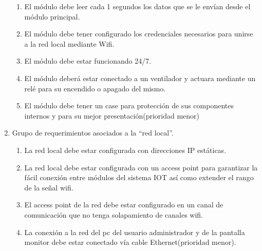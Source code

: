 \documentclass[11pt]{charter}
\begin{document}
\begin{enumerate}
\begin{enumerate}
	\item El módulo debe leer cada 1 segundos los datos que se le envían desde el módulo principal.
	\item El módulo debe tener configurado los credenciales necesarios para unirse a la red local mediante Wifi.
	\item El módulo debe estar funcionando 24/7.
	\item El módulo deberá estar conectado a un ventilador y actuara mediante un relé para su encendido o apagado del mismo.
	\item El módulo debe tener un case para protección de sus componentes internos y para su mejor presentación(prioridad menor)
	\end{enumerate}

\item Grupo de requerimientos asociados a la ``red local''.
	\begin{enumerate}
	\item La red local debe estar configurada con direcciones IP estáticas.
	\item La red local debe estar configurada con un access point para garantizar la fácil conexión entre módulos del sistema IOT así como extender el rango de la señal wifi.
	\item El access point de la red debe estar configurado en un canal de comunicación que no tenga solapamiento de canales wifi.
	\item La conexión a la red del pc del usuario administrador y de la pantalla monitor debe estar conectado vía cable Ethernet(prioridad menor).
	\end{enumerate}

\end{enumerate}
\end{document}
